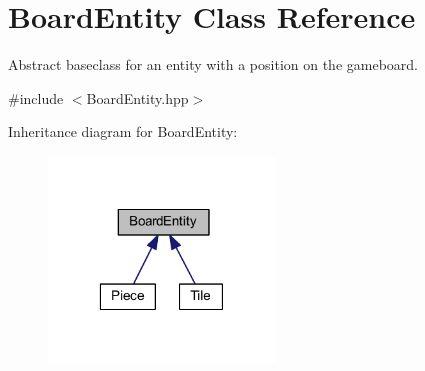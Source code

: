 \hypertarget{class_board_entity}{\section{Board\-Entity Class Reference}
\label{class_board_entity}
}


Abstract baseclass for an entity with a position on the gameboard.  




{\ttfamily \#include $<$Board\-Entity.\-hpp$>$}



Inheritance diagram for Board\-Entity\-:
\nopagebreak
\begin{figure}[H]
\begin{center}
\leavevmode
\includegraphics[width=171pt]{class_board_entity__inherit__graph}
\end{center}
\end{figure}
